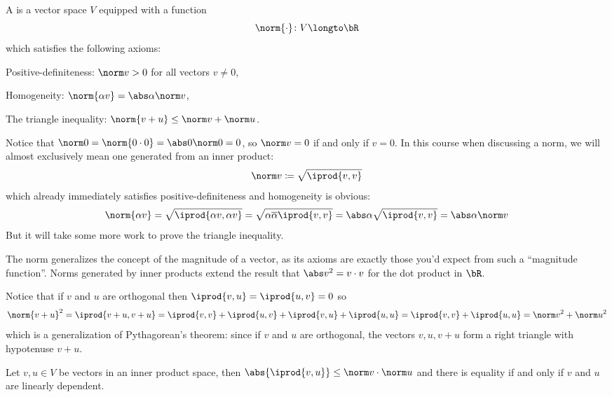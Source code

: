 \begin{defn*}

    A  is a vector space $V$ equipped with a  function
    \[ \norm{\cdot}\colon V\longto\bR \]
    which satisfies the following axioms:
    \benum
        \item Positive-definiteness: $\norm v>0$ for all vectors $v\neq0$,
        \item Homogeneity: $\norm{\alpha v}=\abs\alpha\norm v$,
        \item The triangle inequality: $\norm{v+u}\leq\norm v+\norm u$.
    \eenum

\end{defn*}

Notice that $\norm 0=\norm{0\cdot0}=\abs0\norm0=0$, so $\norm v=0$ if and only if $v=0$.
In this course when discussing a norm, we will almost exclusively mean one generated from an inner product:
\[ \norm v\coloneqq\sqrt{\iprod{v,v}} \]
which already immediately satisfies positive-definiteness and homogeneity is obvious:
\[ \norm{\alpha v}=\sqrt{\iprod{\alpha v,\alpha v}}=\sqrt{\alpha\overline\alpha\iprod{v,v}}=\abs\alpha\sqrt{\iprod{v,v}} = \abs\alpha\norm v \]
But it will take some more work to prove the triangle inequality.

The norm generalizes the concept of the magnitude of a vector, as its axioms are exactly those you'd expect from such a ``magnitude function''.
Norms generated by inner products extend the result that $\abs v^2=v\cdot v$ for the dot product in $\bR$.

Notice that if $v$ and $u$ are orthogonal then $\iprod{v,u}=\iprod{u,v}=0$ so
\[ \norm{v+u}^2 = \iprod{v+u,v+u} = \iprod{v,v} + \iprod{u,v} + \iprod{v,u} + \iprod{u,u} = \iprod{v,v} + \iprod{u,u} = \norm v^2+\norm u^2 \]
which is a generalization of Pythagorean's theorem: since if $v$ and $u$ are orthogonal, the vectors $v,u,v+u$ form a right triangle with hypotenuse $v+u$.

\begin{thrm*}

    Let $v,u\in V$ be vectors in an inner product space, then $\abs{\iprod{v,u}}\leq\norm v\cdot\norm u$ and there is equality if and only if $v$ and $u$ are linearly dependent.

\end{thrm*}

